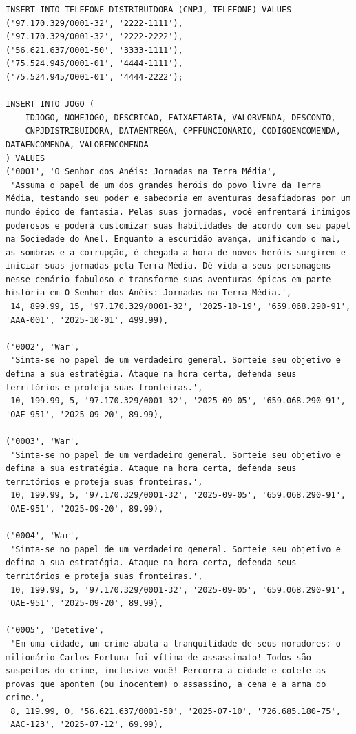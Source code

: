 \documentclass[11pt]{article}
\begin{document}
\begin{Verbatim}[breaklines=true, breakanywhere=true]
INSERT INTO TELEFONE_DISTRIBUIDORA (CNPJ, TELEFONE) VALUES
('97.170.329/0001-32', '2222-1111'),
('97.170.329/0001-32', '2222-2222'),
('56.621.637/0001-50', '3333-1111'),
('75.524.945/0001-01', '4444-1111'),
('75.524.945/0001-01', '4444-2222');

INSERT INTO JOGO (
    IDJOGO, NOMEJOGO, DESCRICAO, FAIXAETARIA, VALORVENDA, DESCONTO,
    CNPJDISTRIBUIDORA, DATAENTREGA, CPFFUNCIONARIO, CODIGOENCOMENDA, DATAENCOMENDA, VALORENCOMENDA
) VALUES
('0001', 'O Senhor dos Anéis: Jornadas na Terra Média',
 'Assuma o papel de um dos grandes heróis do povo livre da Terra Média, testando seu poder e sabedoria em aventuras desafiadoras por um mundo épico de fantasia. Pelas suas jornadas, você enfrentará inimigos poderosos e poderá customizar suas habilidades de acordo com seu papel na Sociedade do Anel. Enquanto a escuridão avança, unificando o mal, as sombras e a corrupção, é chegada a hora de novos heróis surgirem e iniciar suas jornadas pela Terra Média. Dê vida a seus personagens nesse cenário fabuloso e transforme suas aventuras épicas em parte história em O Senhor dos Anéis: Jornadas na Terra Média.',
 14, 899.99, 15, '97.170.329/0001-32', '2025-10-19', '659.068.290-91', 'AAA-001', '2025-10-01', 499.99),

('0002', 'War',
 'Sinta-se no papel de um verdadeiro general. Sorteie seu objetivo e defina a sua estratégia. Ataque na hora certa, defenda seus territórios e proteja suas fronteiras.',
 10, 199.99, 5, '97.170.329/0001-32', '2025-09-05', '659.068.290-91', 'OAE-951', '2025-09-20', 89.99),

('0003', 'War',
 'Sinta-se no papel de um verdadeiro general. Sorteie seu objetivo e defina a sua estratégia. Ataque na hora certa, defenda seus territórios e proteja suas fronteiras.',
 10, 199.99, 5, '97.170.329/0001-32', '2025-09-05', '659.068.290-91', 'OAE-951', '2025-09-20', 89.99),

('0004', 'War',
 'Sinta-se no papel de um verdadeiro general. Sorteie seu objetivo e defina a sua estratégia. Ataque na hora certa, defenda seus territórios e proteja suas fronteiras.',
 10, 199.99, 5, '97.170.329/0001-32', '2025-09-05', '659.068.290-91', 'OAE-951', '2025-09-20', 89.99),

('0005', 'Detetive',
 'Em uma cidade, um crime abala a tranquilidade de seus moradores: o milionário Carlos Fortuna foi vítima de assassinato! Todos são suspeitos do crime, inclusive você! Percorra a cidade e colete as provas que apontem (ou inocentem) o assassino, a cena e a arma do crime.',
 8, 119.99, 0, '56.621.637/0001-50', '2025-07-10', '726.685.180-75', 'AAC-123', '2025-07-12', 69.99),


\end{Verbatim}
\end{document}
